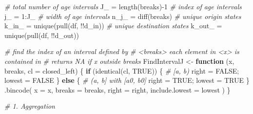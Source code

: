 \documentclass[10pt, twoside]{article}
\newenvironment{Shaded}{}{}
\newcommand{\AttributeTok}[1]{#1}
\newcommand{\CommentTok}[1]{\textit{#1}}
\newcommand{\ConstantTok}[1]{#1}
\newcommand{\ControlFlowTok}[1]{\textbf{#1}}
\newcommand{\DecValTok}[1]{#1}
\newcommand{\FunctionTok}[1]{#1}
\newcommand{\NormalTok}[1]{#1}
\newcommand{\OtherTok}[1]{#1}
\newcommand{\SpecialCharTok}[1]{#1}
\begin{document}
\begin{Shaded}
\begin{Highlighting}[]
  \CommentTok{\# total number of age intervals}
\NormalTok{  J\_ }\OtherTok{=} \FunctionTok{length}\NormalTok{(breaks)}\SpecialCharTok{{-}}\DecValTok{1}
  \CommentTok{\# index of age intervals}
\NormalTok{  j\_ }\OtherTok{=} \DecValTok{1}\SpecialCharTok{:}\NormalTok{J\_}
  \CommentTok{\# width of age intervals}
\NormalTok{  n\_j\_ }\OtherTok{=} \FunctionTok{diff}\NormalTok{(breaks)}
  \CommentTok{\# unique origin states}
\NormalTok{  k\_in\_ }\OtherTok{=} \FunctionTok{unique}\NormalTok{(}\FunctionTok{pull}\NormalTok{(df, }\SpecialCharTok{!!}\NormalTok{d\_in))}
  \CommentTok{\# unique destination states}
\NormalTok{  k\_out\_ }\OtherTok{=} \FunctionTok{unique}\NormalTok{(}\FunctionTok{pull}\NormalTok{(df, }\SpecialCharTok{!!}\NormalTok{d\_out))}

  \CommentTok{\# find the index of an interval defined by}
  \CommentTok{\# \textless{}breaks\textgreater{} each element in \textless{}x\textgreater{} is contained in}
  \CommentTok{\# returns NA if x outside breaks}
\NormalTok{  FindIntervalJ }\OtherTok{\textless{}{-}}
    \ControlFlowTok{function}\NormalTok{ (x, breaks, }\AttributeTok{cl =}\NormalTok{ closed\_left) \{}
      \ControlFlowTok{if}\NormalTok{ (}\FunctionTok{identical}\NormalTok{(cl, }\ConstantTok{TRUE}\NormalTok{)) \{}
        \CommentTok{\# [a, b)}
\NormalTok{        right }\OtherTok{=} \ConstantTok{FALSE}\NormalTok{; lowest }\OtherTok{=} \ConstantTok{FALSE}
\NormalTok{      \} }\ControlFlowTok{else}\NormalTok{ \{}
        \CommentTok{\# (a, b] with [a0, b0]}
\NormalTok{        right }\OtherTok{=} \ConstantTok{TRUE}\NormalTok{; lowest }\OtherTok{=} \ConstantTok{TRUE}
\NormalTok{      \}}
      \FunctionTok{.bincode}\NormalTok{(}
        \AttributeTok{x =}\NormalTok{ x, }\AttributeTok{breaks =}\NormalTok{ breaks,}
        \AttributeTok{right =}\NormalTok{ right, }\AttributeTok{include.lowest =}\NormalTok{ lowest}
\NormalTok{      )}
\NormalTok{    \}}

  \CommentTok{\# 1. Aggregation}


\end{Highlighting}
\end{Shaded}
\end{document}
